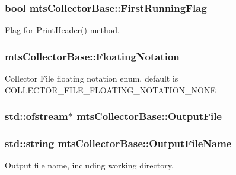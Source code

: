 \subsubsection[{First\+Running\+Flag}]{\setlength{\rightskip}{0pt plus 5cm}bool mts\+Collector\+Base\+::\+First\+Running\+Flag\hspace{0.3cm}{\ttfamily [protected]}}\label{classmts_collector_base_abed8163d5f91e30ac10344e82c405cd7}
Flag for Print\+Header() method. \hypertarget{classmts_collector_base_a1f80a8a534930afcbeade8a12f7d63e3}{}
\subsubsection[{Floating\+Notation}]{ mts\+Collector\+Base\+::\+Floating\+Notation\hspace{0.3cm}{\ttfamily [protected]}}\label{classmts_collector_base_a1f80a8a534930afcbeade8a12f7d63e3}
Collector File floating notation enum, default is C\+O\+L\+L\+E\+C\+T\+O\+R\+\_\+\+F\+I\+L\+E\+\_\+\+F\+L\+O\+A\+T\+I\+N\+G\+\_\+\+N\+O\+T\+A\+T\+I\+O\+N\+\_\+\+N\+O\+N\+E \hypertarget{classmts_collector_base_a7072747db6ae6fb544364d8fe11f741d}{}
\subsubsection[{Output\+File}]{\setlength{\rightskip}{0pt plus 5cm}std\+::ofstream$\ast$ mts\+Collector\+Base\+::\+Output\+File\hspace{0.3cm}{\ttfamily [protected]}}\label{classmts_collector_base_a7072747db6ae6fb544364d8fe11f741d}
\hypertarget{classmts_collector_base_a86248c53c5807c8b9a21b232d89b26dd}{}
\subsubsection[{Output\+File\+Name}]{\setlength{\rightskip}{0pt plus 5cm}std\+::string mts\+Collector\+Base\+::\+Output\+File\+Name\hspace{0.3cm}{\ttfamily [protected]}}\label{classmts_collector_base_a86248c53c5807c8b9a21b232d89b26dd}
Output file name, including working directory. \hypertarget{classmts_collector_base_ac11bfb1b9eceb30e20bb216454e8d067}{}
